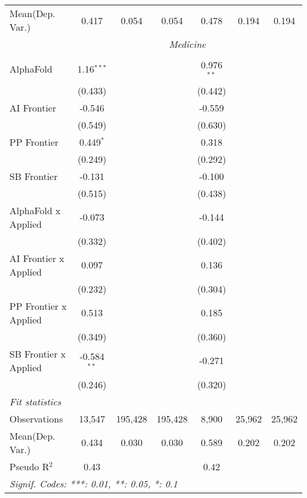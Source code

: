 \begin{tabular}{lcccccc}
Mean(Dep. Var.) & 0.417 & 0.054 & 0.054 & 0.478 & 0.194 & 0.194 \\
 & \multicolumn{6}{c}{\textit{Medicine}} \\ \\
   AlphaFold             & 1.16$^{***}$  &         &         & 0.976$^{**}$ &        &   \\   
                         & (0.433)       &         &         & (0.442)      &        &   \\   
   AI Frontier           & -0.546        &         &         & -0.559       &        &   \\   
                         & (0.549)       &         &         & (0.630)      &        &   \\   
   PP Frontier           & 0.449$^{*}$   &         &         & 0.318        &        &   \\   
                         & (0.249)       &         &         & (0.292)      &        &   \\   
   SB Frontier           & -0.131        &         &         & -0.100       &        &   \\   
                         & (0.515)       &         &         & (0.438)      &        &   \\   
   AlphaFold x Applied   & -0.073        &         &         & -0.144       &        &   \\   
                         & (0.332)       &         &         & (0.402)      &        &   \\   
   AI Frontier x Applied & 0.097         &         &         & 0.136        &        &   \\   
                         & (0.232)       &         &         & (0.304)      &        &   \\   
   PP Frontier x Applied & 0.513         &         &         & 0.185        &        &   \\   
                         & (0.349)       &         &         & (0.360)      &        &   \\   
   SB Frontier x Applied & -0.584$^{**}$ &         &         & -0.271       &        &   \\   
                         & (0.246)       &         &         & (0.320)      &        &   \\   
   \midrule
   \emph{Fit statistics}\\
   Observations          & 13,547        & 195,428 & 195,428 & 8,900        & 25,962 & 25,962\\  
Mean(Dep. Var.) & 0.434 & 0.030 & 0.030 & 0.589 & 0.202 & 0.202 \\
   Pseudo R$^2$          & 0.43          &         &         & 0.42         &        & \\  
   \midrule \midrule
   \multicolumn{7}{l}{\emph{Signif. Codes: ***: 0.01, **: 0.05, *: 0.1}}\\
\end{tabular}
\par\endgroup

